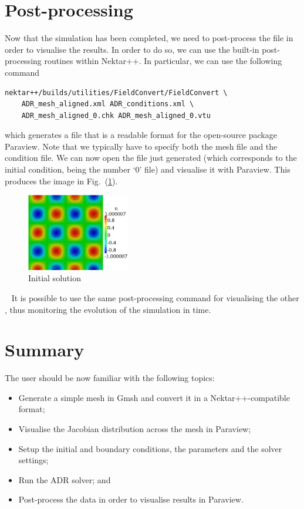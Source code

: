 \section{Post-processing}
\label{adr-post}
Now that the simulation has been completed, we need to post-process the file in order to visualise 
the results. In order to do so, we can use the built-in post-processing routines within Nektar++.
In particular, we can use the following command
%
\begin{lstlisting}[style=BashInputStyle]
nektar++/builds/utilities/FieldConvert/FieldConvert \
    ADR_mesh_aligned.xml ADR_conditions.xml \ 
    ADR_mesh_aligned_0.chk ADR_mesh_aligned_0.vtu
\end{lstlisting}
%
which generates a  file that is a readable format for the open-source package Paraview.
Note that we typically have to specify both the mesh  file and the condition  
file. We can now open the \inlsh{.vtu} file just generated (which corresponds to the initial condition, 
being the number `0' \inlsh{.chk} file) and visualise it with Paraview. This produces the image 
in Fig.~(\ref{f:IC}).
%
\begin{figure}[h!]
\centering
\includegraphics[width=0.4\textwidth]{Figures/ADR_mesh_IC}
\caption{Initial solution}
\label{f:IC}
\end{figure}~
%
It is possible to use the same post-processing command for visualising the other , 
thus monitoring the evolution of the simulation in time.  


\section{Summary}
The user should be now familiar with the following topics:
\vspace{-0.5cm}
\begin{itemize}
\item Generate a simple mesh in Gmsh and convert it in a Nektar++-compatible format;
\item Visualise the Jacobian distribution across the mesh in Paraview;
\item Setup the initial and boundary conditions, the parameters and the solver settings;
\item Run the ADR solver; and
\item Post-process the data in order to visualise results in Paraview.
\end{itemize}


